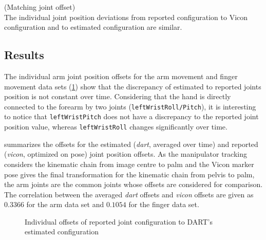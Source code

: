 \begin{hypothesis}(Matching joint offset)\\
The individual joint position deviations from reported configuration to Vicon configuration and to estimated configuration are similar.
\label{hyp:matching_joint_offset}
\end{hypothesis}

\subsection{Results}

The individual arm joint position offsets for the arm movement and finger movement data sets (\cref{fig:estimated_offsets}) show that the discrepancy of estimated to reported joints position is not constant over time. Considering that the hand is directly connected to the forearm by two joints (\texttt{leftWristRoll/Pitch}), it is interesting to notice that \texttt{leftWristPitch} does not have a discrepancy to the reported joint position value, whereas \texttt{leftWristRoll} changes significantly over time.

 summarizes the offsets for the estimated (\textit{dart}, averaged over time) and reported (\textit{vicon}, optimized on pose) joint position offsets. As the manipulator tracking considers the kinematic chain from image centre to palm and the Vicon marker pose gives the final transformation for the kinematic chain from pelvis to palm, the arm joints are the common joints whose offsets are considered for comparison.
The correlation between the averaged \textit{dart} offsets and \textit{vicon} offsets are given as $0.3366$ for the arm data set and $0.1054$ for the finger data set.

\begin{figure}[h]
\centering
{}

\caption[Estimated offsets]{Individual offsets of reported joint configuration to DART's estimated configuration}
\label{fig:estimated_offsets}
\end{figure}


